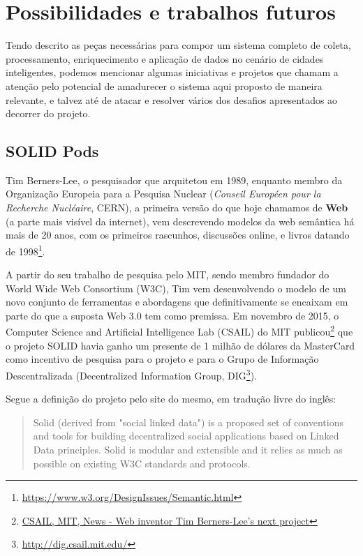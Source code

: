 \chapter{Possibilidades e trabalhos futuros} \label{c:possibilidades_trabalhos_futuros}

Tendo descrito as peças necessárias para compor um sistema completo de coleta, processamento, enriquecimento e aplicação de dados no cenário de cidades inteligentes, podemos mencionar algumas iniciativas e projetos que chamam a atenção pelo potencial de amadurecer o sistema aqui proposto de maneira relevante, e talvez até de atacar e resolver vários dos desafios apresentados ao decorrer do projeto.

\section{SOLID Pods}

Tim Berners-Lee, o pesquisador que arquitetou em 1989, enquanto membro da Organização Europeia para a Pesquisa Nuclear (\textit{Conseil Européen pour la Recherche Nucléaire}, CERN), a primeira versão do que hoje chamamos de \textbf{Web} (a parte mais visível da internet), vem descrevendo modelos da web semântica há mais de 20 anos, com os primeiros rascunhos, discussões online, e livros \cite{berners2001weaving} datando de 1998\footnote{\url{https://www.w3.org/DesignIssues/Semantic.html}}.

A partir do seu trabalho de pesquisa pelo MIT, sendo membro fundador do World Wide Web Consortium (W3C), Tim vem desenvolvendo o modelo de um novo conjunto de ferramentas e abordagens que definitivamente se encaixam em parte do que a suposta Web 3.0 tem como premissa. Em novembro de 2015, o Computer Science and Artificial Intelligence Lab (CSAIL) do MIT publicou\footnote{\href{https://www.csail.mit.edu/news/web-inventor-tim-berners-lees-next-project-platform-gives-users-control-their-data}{CSAIL, MIT, News - Web inventor Tim Berners-Lee's next project}} que o projeto SOLID havia ganho um presente de 1 milhão de dólares da MasterCard como incentivo de pesquisa para o projeto e para o Grupo de Informação Descentralizada (Decentralized Information Group, DIG\footnote{\url{http://dig.csail.mit.edu/}}).

Segue a definição do projeto pelo site do mesmo, em tradução livre do inglês:

\begin{quote}
    Solid (derived from "social linked data") is a proposed set of conventions and tools for building decentralized social applications based on Linked Data principles. Solid is modular and extensible and it relies as much as possible on existing W3C standards and protocols.
\end{quote}

